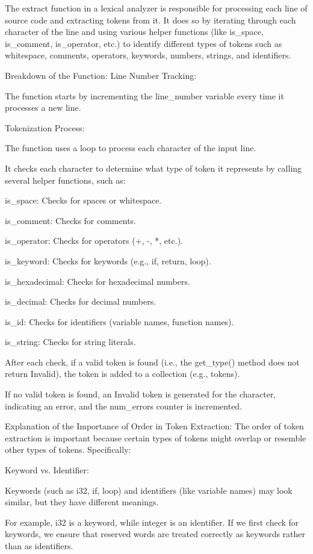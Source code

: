 \documentclass[12pt, a4paper]{report}
\begin{document}
The extract function in a lexical analyzer is responsible for processing each line of source code and extracting tokens from it. It does so by iterating through each character of the line and using various helper functions (like is_space, is_comment, is_operator, etc.) to identify different types of tokens such as whitespace, comments, operators, keywords, numbers, strings, and identifiers.

Breakdown of the Function:
Line Number Tracking:

The function starts by incrementing the line_number variable every time it processes a new line.

Tokenization Process:

The function uses a loop to process each character of the input line.

It checks each character to determine what type of token it represents by calling several helper functions, such as:

is_space: Checks for spaces or whitespace.

is_comment: Checks for comments.

is_operator: Checks for operators (+, -, *, etc.).

is_keyword: Checks for keywords (e.g., if, return, loop).

is_hexadecimal: Checks for hexadecimal numbers.

is_decimal: Checks for decimal numbers.

is_id: Checks for identifiers (variable names, function names).

is_string: Checks for string literals.

After each check, if a valid token is found (i.e., the get_type() method does not return Invalid), the token is added to a collection (e.g., tokens).

If no valid token is found, an Invalid token is generated for the character, indicating an error, and the num_errors counter is incremented.

Explanation of the Importance of Order in Token Extraction:
The order of token extraction is important because certain types of tokens might overlap or resemble other types of tokens. Specifically:

Keyword vs. Identifier:

Keywords (such as i32, if, loop) and identifiers (like variable names) may look similar, but they have different meanings.

For example, i32 is a keyword, while integer is an identifier. If we first check for keywords, we ensure that reserved words are treated correctly as keywords rather than as identifiers.
\end{document}
